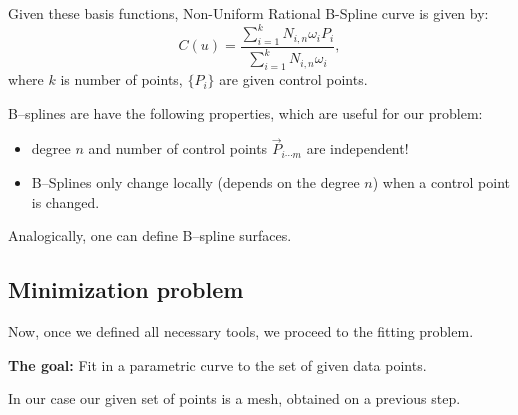 Given these basis functions, Non-Uniform Rational B-Spline curve is given by:
\begin{equation}
C(u) = \frac{\sum_{i=1}^{k}N_{i,n}\omega_{i}P_{i}}{\sum_{i=1}^{k}N_{i,n}\omega_{i}},
\end{equation}
where $k$ is number of points, $\{P_{i}\}$ are given control points.

B--splines are have the following properties, which are useful for our problem:
\begin{itemize}
\item degree $n$ and number of control points $\vec{P}_{i\cdots m}$ are independent!
\item B--Splines only change locally (depends on the degree $n$) when a control point is changed.
\end{itemize}

Analogically, one can define B--spline surfaces.
\subsection{Minimization problem}
Now, once we defined all necessary tools, we proceed to the fitting problem.
\begin{mdframed}
\textbf{The goal:} Fit in a parametric curve to the set of given data points. 
\end{mdframed}
In our case our given set of points is a mesh, obtained on a previous step.
